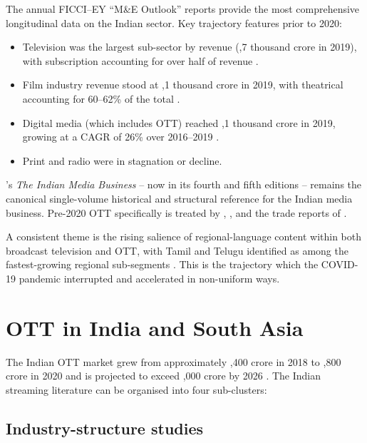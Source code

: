 The annual FICCI--EY ``M\&E Outlook'' reports \citep{ficciey2018,
ficciey2019,ficciey2020} provide the most comprehensive longitudinal
data on the Indian sector.  Key trajectory features prior to 2020:

\begin{itemize}[itemsep=2pt]
  \item Television was the largest sub-sector by revenue (,7
        thousand crore in 2019), with subscription accounting for
        over half of revenue \citep{ficciey2020}.
  \item Film industry revenue stood at ,1 thousand crore
        in 2019, with theatrical accounting for 60--62\% of the
        total \citep{ficciey2020}.
  \item Digital media (which includes OTT) reached ,1
        thousand crore in 2019, growing at a CAGR of 26\% over
        2016--2019 \citep{ficciey2020}.
  \item Print and radio were in stagnation or decline.
\end{itemize}

\citet{kohlikhandekar2013}'s \emph{The Indian Media Business} -- now
in its fourth and fifth editions -- remains the canonical
single-volume historical and structural reference for the Indian
media business.  Pre-2020 OTT specifically is treated by
\citet{punathambekar2013}, \citet{mehta2020streaming},
\citet{kanozia2021} and the trade reports of
\citet{kpmg2019,bcg2018india}.

A consistent theme is the rising salience of regional-language
content within both broadcast television and OTT, with Tamil and
Telugu identified as among the fastest-growing regional sub-segments
\citep{ficciey2020,bcg2018india,statista2019}.  This is the
trajectory which the COVID-19 pandemic interrupted and accelerated
in non-uniform ways.

\section{OTT in India and South Asia}
\label{sec:ott_india}

The Indian OTT market grew from approximately ,400 crore in
2018 to ,800 crore in 2020 and is projected to exceed
,000 crore by 2026 \citep{ficciey2024,kpmg2023,statista2024}.
The Indian streaming literature can be organised into four sub-clusters:

\subsection{Industry-structure studies}

